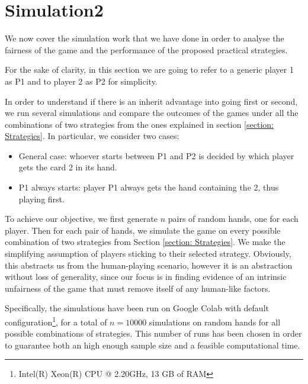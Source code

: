 \section{Simulation2}\label{section:Simulation2}
We now cover the simulation work that we have done in order to analyse the fairness of the game and the performance of the proposed practical strategies.

For the sake of clarity, in this section we are going to refer to a generic player 1 as P1 and to player 2 as P2 for simplicity.

In order to understand if there is an inherit advantage into going first or second, we run several simulations and compare the outcomes of the games under all the combinations of two strategies from the ones explained in section \ref{section: Strategies}. In particular, we consider two cases:
\begin{itemize}
	\item General case: whoever starts between P1 and P2 is decided by which player gets the card 2 in its hand.
	\item P1 always starts: player P1 always gets the hand containing the 2, thus playing first.
\end{itemize}
To achieve our objective, we first generate $n$ pairs of random hands, one for each player. Then for each pair of hands, we simulate the game on every possible combination of two strategies from Section \ref{section: Strategies}.
We make the simplifying assumption of players sticking to their selected strategy. Obviously, this abstracts us from the human-playing scenario, however it is an abstraction without loss of generality, since our focus is in finding evidence of an intrinsic unfairness of the game that must remove itself of any human-like factors.

Specifically, the simulations have been run on Google Colab with default configuration\footnote{Intel(R) Xeon(R) CPU @ 2.20GHz, 13 GB of RAM}, for a total of $n = 10000$ simulations on random hands for all possible combinations of strategies. This number of runs has been chosen in order to guarantee both an high enough sample size and a feasible computational time.





